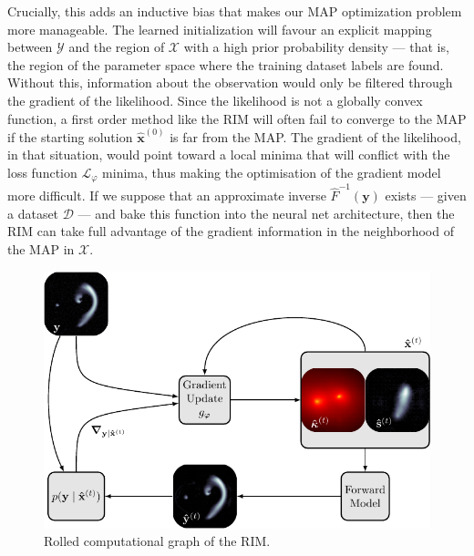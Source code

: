 \documentclass[twocolumn]{aastex631}
\begin{document}
Crucially, this adds an inductive 
bias that makes our MAP optimization problem more manageable. 
The learned initialization
will favour an explicit mapping between 
$\mathcal{Y}$ and the region of $\mathcal{X}$ with a high prior 
probability density --- that is, the region of 
the parameter space where the training dataset labels are found.
Without this, information about the observation
would only be filtered through the gradient of the likelihood. 
Since the likelihood is not a globally convex function, 
a first order method like the RIM will often fail to converge to 
the MAP if the starting solution $\hat{\mathbf{x}}^{(0)}$ 
is far from the MAP. The gradient of the likelihood, in that situation, 
would point toward a local minima that will conflict 
with the loss function $\mathcal{L}_\varphi$ minima, thus making the optimisation 
of the gradient model more difficult.
If we suppose that an approximate inverse $\hat{F}^{-1}(\mathbf{y})$ exists
--- given a dataset $\mathcal{D}$ ---
and bake this function into the neural net architecture, then the RIM
can take full advantage of the gradient information in the neighborhood of the 
MAP in $\mathcal{X}$.


\begin{figure}
        \centering
        \includegraphics[width=\linewidth]{figures/schematic_rim}
        \caption{Rolled computational graph of the RIM.}
        \label{fig:rolled_graph}
\end{figure}
\end{document}
